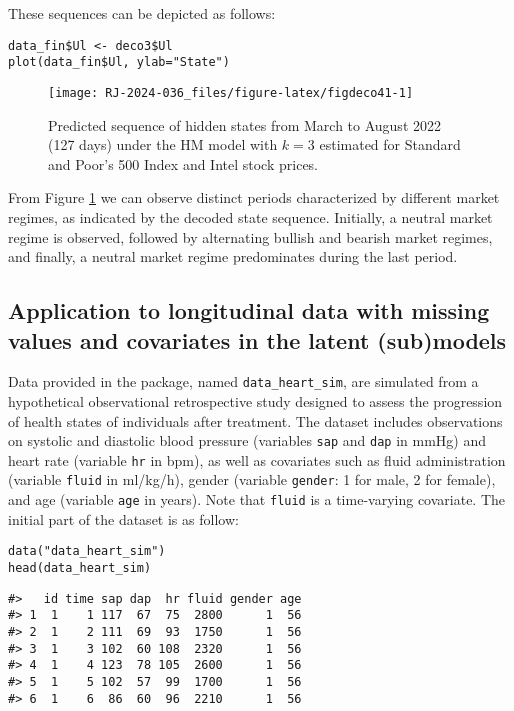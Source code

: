These sequences can be depicted as follows:

\begin{verbatim}
data_fin$Ul <- deco3$Ul
plot(data_fin$Ul, ylab="State")
\end{verbatim}

\begin{figure}

{\centering \texttt{[image: RJ-2024-036\_files/figure-latex/figdeco41-1]} 

}

\caption{Predicted sequence of hidden states from March to August 2022  (127 days) under the HM model with $k=3$ estimated for Standard and Poor's 500 Index and Intel stock prices.}\label{fig:figdeco41}
\end{figure}

From Figure \ref{fig:figdeco41} we can observe distinct periods
characterized by different market regimes, as indicated by the decoded
state sequence. Initially, a neutral market regime is observed, followed
by alternating bullish and bearish market regimes, and finally, a
neutral market regime predominates during the last period.

\hypertarget{subsec:HMcontapp2}{%
\subsection{Application to longitudinal data with missing values and covariates in the latent (sub)models}\label{subsec:HMcontapp2}}

Data provided in the package, named \texttt{data\_heart\_sim}, are simulated from
a hypothetical observational retrospective study designed to assess the
progression of health states of individuals after treatment. The dataset
includes observations on systolic and diastolic blood pressure
(variables \texttt{sap} and \texttt{dap} in mmHg) and heart rate (variable \texttt{hr} in
bpm), as well as covariates such as fluid administration (variable
\texttt{fluid} in ml/kg/h), gender (variable \texttt{gender}: 1 for male, 2 for
female), and age (variable \texttt{age} in years). Note that \texttt{fluid} is a
time-varying covariate. The initial part of the dataset is as follow:

\begin{verbatim}
data("data_heart_sim")
head(data_heart_sim)
\end{verbatim}

\begin{verbatim}
#>   id time sap dap  hr fluid gender age
#> 1  1    1 117  67  75  2800      1  56
#> 2  1    2 111  69  93  1750      1  56
#> 3  1    3 102  60 108  2320      1  56
#> 4  1    4 123  78 105  2600      1  56
#> 5  1    5 102  57  99  1700      1  56
#> 6  1    6  86  60  96  2210      1  56
\end{verbatim}

